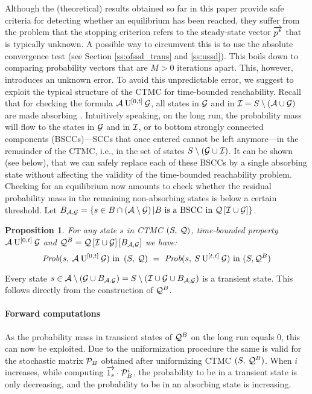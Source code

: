 \documentclass[times, 10pt,twocolumn]{article}
\newtheorem{prop}[theorem]{Proposition}
\begin{document}
{}
	
	Although the (theoretical) results obtained so far in this paper provide safe criteria for detecting whether an equilibrium has been reached, they suffer from the problem that the stopping criterion refers to the steady-state vector $\overrightarrow{p^{*}}$ that is typically unknown.  A possible way to circumvent this is to use the absolute convergence test (see Section \ref{ss:ofssd_trans} and \ref{ss:ussd}).  This boils down to comparing probability vectors that are $M > 0$ iterations apart.  This, however, introduces an unknown error.  To avoid this unpredictable error, we suggest to exploit the typical structure of the CTMC for time-bounded reachability.  Recall that for checking the formula $\mathcal{A} \: \mathrm{U}^{[0,t]} \: \mathcal{G}$, all states in $\mathcal{G}$ and in $\mathcal{I} = S \setminus \left( \mathcal{A} \cup \mathcal{G} \right)$ are made absorbing \cite{BaierHHK_TSE03}.  Intuitively speaking, on the long run, the probability mass will flow to the states in $\mathcal{G}$ and in $\mathcal{I}$, or to bottom strongly connected components (BSCCs)---SCCs that once entered cannot be left anymore---in the remainder of the CTMC, i.e., in the set of states $S \setminus (\mathcal{G} \cup \mathcal{I})$.  It can be shown (see below), that we can safely replace each of these BSCCs by a single absorbing state without affecting the validity of the time-bounded reachability problem.  Checking for an equilibrium now amounts to check whether the residual probability mass in the remaining non-absorbing states is below a certain threshold.
	Let $B_{ \mathcal{A}, \mathcal{G} } = \left\{ s \in B \cap \left( \mathcal{A} \setminus \mathcal{G} \right) | B \text{ is a BSCC in } \mathcal{Q}\left[ \mathcal{I} \cup \mathcal{G} \right] \right\}$.
	\begin{prop}
	For any state $s$ in CTMC $\left( S,\: \mathcal{Q} \right)$, time-bounded property $\mathcal{A} \: \mathrm{U}^{[0,t]} \: \mathcal{G}$ and $\mathcal{Q}^{B} = \mathcal{Q}\left[ \mathcal{I} \cup \mathcal{G} \right] \left[ B_{ \mathcal{A}, \mathcal{G} } \right]$ we have:
		{\small
		\[
			\mbox{\it Prob}(s, \: \mathcal{A} \: \mathrm{U}^{[0,t]} \: \mathcal{G} )\text{ in }\left( S,\: \mathcal{Q} \right) \ = \ \mbox{\it Prob}(s, \: S \: \mathrm{U}^{[t,t]} \: \mathcal{G} )\text{ in }(S,\mathcal{Q}^{B})
		\]
		}
	\end{prop}
	
	Every state $s \in \mathcal{A} \setminus \left( \mathcal{G} \cup B_{ \mathcal{A}, \mathcal{G} } \right) = S \setminus (\mathcal{I} \cup \mathcal{G} \cup B_{ \mathcal{A}, \mathcal{G} })$ is a transient state. This follows directly from the construction of $\mathcal{Q}^{B}$. 
	
	\paragraph{Forward computations}	
	As the probability mass in transient states of $\mathcal{Q}^{B}$ on the long run equals 0, this can now be exploited. Due to the uniformization procedure the same is valid for the stochastic matrix $\mathcal{P}_{B}$ obtained after uniformizing CTMC $(S,\:\mathcal{Q}^{B})$. When $i$ increases, while computing $\overrightarrow{1_{s} } \cdot \mathcal{P}_{B}^{i}$, the probability to be in a transient state is only decreasing, and the probability to be in an absorbing state is increasing.
	
\end{document}

